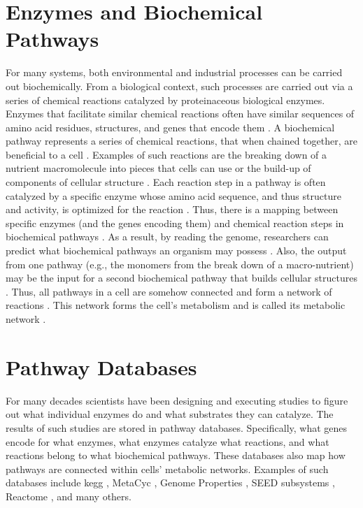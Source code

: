 \section{Enzymes and Biochemical Pathways} \label{enzymes-and-pathways} 

For many systems, both environmental and industrial processes can be carried out biochemically. From a biological context, such processes are carried out via a series of chemical reactions catalyzed by proteinaceous biological enzymes. Enzymes that facilitate similar chemical reactions often \cite{galperin1998analogous} have similar sequences of amino acid residues, structures, and genes that encode them \cite{zhang2003evolution}. A biochemical pathway represents a series of chemical reactions, that when chained together, are beneficial to a cell \cite{michal2012biochemical}. Examples of such reactions are the breaking down of a nutrient macromolecule into pieces that cells can use or the build-up of components of cellular structure \cite{wagner2012metabolic}. Each reaction step in a pathway is often \cite{keller2015widespread,tawfik2010enzyme} catalyzed by a specific enzyme whose amino acid sequence, and thus structure and activity, is optimized for the reaction \cite{michal2012biochemical,zhang2003evolution,fersht1999structure}. Thus, there is a mapping between specific enzymes (and the genes encoding them) and chemical reaction steps in biochemical pathways \cite{thiele2010protocol}. As a result, by reading the genome, researchers can predict what biochemical pathways an organism may possess \cite{abubucker2012metabolic,thiele2010protocol}. Also, the output from one pathway (e.g., the monomers from the break down of a macro-nutrient) may be the input for a second biochemical pathway that builds cellular structures \cite{wagner2012metabolic,stelling2002metabolic}. Thus, all pathways in a cell are somehow connected and form a network of reactions \cite{wagner2012metabolic,stelling2002metabolic}. This network forms the cell's metabolism and is called its metabolic network \cite{wagner2012metabolic}.

\section{Pathway Databases} \label{pathway-databases}

For many decades scientists have been designing and executing studies to figure out what individual enzymes do and what substrates they can catalyze. The results of such studies are stored in pathway databases. Specifically, what genes encode for what enzymes, what enzymes catalyze what reactions, and what reactions belong to what biochemical pathways. These databases also map how pathways are connected within cells' metabolic networks. Examples of such databases include \gls{kegg} \cite{kanehisa2000kegg}, MetaCyc \cite{karp2002metacyc}, Genome Properties \cite{richardson2018genome}, SEED subsystems \cite{overbeek2005subsystems}, Reactome \cite{croft2013reactome}, and many others.

